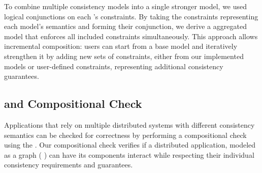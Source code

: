 To combine multiple consistency models into a single stronger model, we used
logical conjunctions on each \sysmod{}'s constraints. By taking the constraints
representing each model's semantics and forming their conjunction, we derive a
aggregated model that enforces all included constraints simultaneously.
This approach allows incremental composition: users can start from a
base model and iteratively strengthen it by adding new sets of constraints,
either from our implemented models or user-defined constraints, representing
additional consistency guarantees.

\subsection{\sysgraph{} and Compositional Check}
\label{subsec:search}

Applications that rely on multiple distributed systems with different
consistency semantics can be checked for correctness by performing a
compositional check using the \sysgraph{}.
Our compositional check
verifies if a distributed application, modeled as a graph (\ie
\sysgraph{}) can have its components interact while 
respecting their individual consistency requirements and guarantees.



